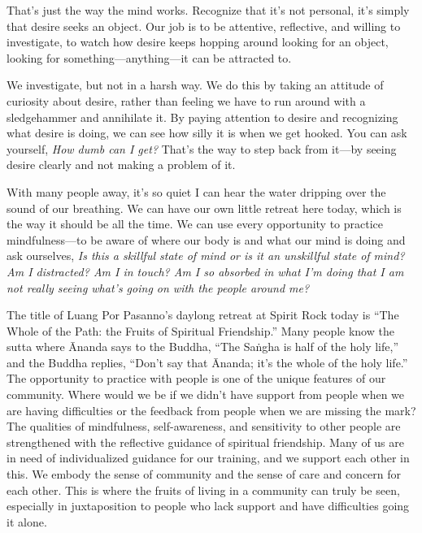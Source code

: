 That's just the way the mind works. Recognize that it's not personal, 
it's simply that desire seeks an object. Our job is to be attentive, 
reflective, and willing to investigate, to watch how desire keeps 
hopping around looking for an object, looking for 
something---anything---it can be attracted to.

We investigate, but not in a harsh way. We do this by taking an 
attitude of curiosity about desire, rather than feeling we have to run 
around with a sledgehammer and annihilate it. By paying attention to 
desire and recognizing what desire is doing, we can see how silly it is 
when we get hooked. You can ask yourself, \emph{How dumb can I get?} 
That's the way to step back from it---by seeing desire clearly and not 
making a problem of it.


With many people away, it's so quiet I can hear the water dripping over 
the sound of our breathing. We can have our own little retreat here 
today, which is the way it should be all the time. We can use every 
opportunity to practice mindfulness---to be aware of where our body is 
and what our mind is doing and ask ourselves, \emph{Is this a skillful 
state of mind or is it an unskillful state of mind? Am I distracted? Am 
I in touch? Am I so absorbed in what I'm doing that I am not really 
seeing what's going on with the people around me?}

The title of Luang Por Pasanno's daylong retreat at Spirit Rock today 
is ``The Whole of the Path: the Fruits of Spiritual Friendship.'' Many 
people know the sutta where Ānanda says to the Buddha, ``The Saṅgha 
is half of the holy life,'' and the Buddha replies, ``Don't say that 
Ānanda; it's the whole of the holy life.'' The opportunity to practice 
with people is one of the unique features of our community. Where would 
we be if we didn't have support from people when we are having 
difficulties or the feedback from people when we are missing the mark? 
The qualities of mindfulness, self-awareness, and sensitivity to other 
people are strengthened with the reflective guidance of spiritual 
friendship. Many of us are in need of individualized guidance for our 
training, and we support each other in this. We embody the sense of 
community and the sense of care and concern for each other. This is 
where the fruits of living in a community can truly be seen, especially 
in juxtaposition to people who lack support and have difficulties going 
it alone.

